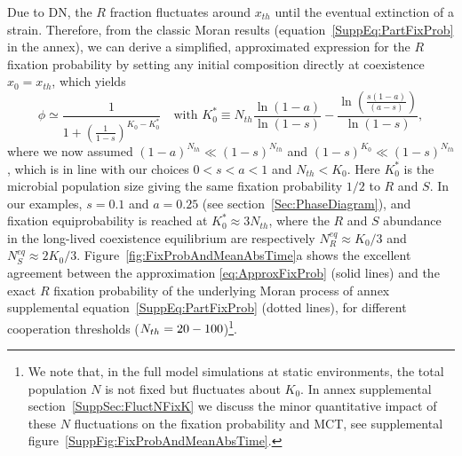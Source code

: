 \documentclass{article}
\begin{document}
Due to DN, the $R$ fraction fluctuates around $x_{th}$ until the eventual extinction of a strain. Therefore, from the classic Moran results (equation~\eqref{SuppEq:PartFixProb} in the annex), we can derive a simplified, approximated expression for the $R$ fixation probability by setting any initial composition directly at coexistence \(x_0=x_{th}\), which yields
\begin{equation}
    \phi\simeq\frac{1}{1+\left(\frac{1}{1-s}\right)^{K_0-K_{0}^{*}}}\text{ ~~with }K_{0}^{*}\equiv N_{th}\frac{\ln\left(1-a\right)}{\ln\left(1-s\right)}-\frac{\ln{\left(\frac{s(1-a)}{(a-s)}\right)}}{\ln{\left(1-s\right)}},
    \label{eq:ApproxFixProb}
\end{equation}
where we now assumed \(\left(1-a\right)^{N_{th}}\ll\left(1-s\right)^{N_{th}}\) and \(\left(1-s\right)^{K_0}\ll\left(1-s\right)^{N_{th}}\), which is in line with our choices $0<s<a<1$ and $N_{th}<K_0$. Here \(K_{0}^{*}\) is the microbial population size giving the same fixation probability \(1/2\) to \(R\) and \(S\). In our examples, \(s=0.1\) and \(a=0.25\) (see section~\ref{Sec:PhaseDiagram}), and fixation equiprobability is reached at \(K_{0}^{*}\approx3N_{th}\), where the \(R\) and \(S\) abundance in the long-lived coexistence equilibrium are respectively \(N_{R}^{eq}\approx K_0/3\) and \(N_{S}^{eq}\approx 2K_0/3\). Figure~\ref{fig:FixProbAndMeanAbsTime}a shows the excellent agreement between the approximation \eqref{eq:ApproxFixProb} (solid lines) and the exact $R$ fixation probability of the underlying Moran process of annex supplemental equation~\eqref{SuppEq:PartFixProb} (dotted lines), for different cooperation thresholds (\(N_{th}=20 \--100\))\footnote{We note that, in the full model simulations at static environments, the total population \(N\) is not fixed but fluctuates about \(K_{0}\). In annex supplemental section~\ref{SuppSec:FluctNFixK} we discuss the minor quantitative impact of these \(N\) fluctuations on the fixation probability and MCT, see supplemental figure~\ref{SuppFig:FixProbAndMeanAbsTime}.}.
\end{document}
